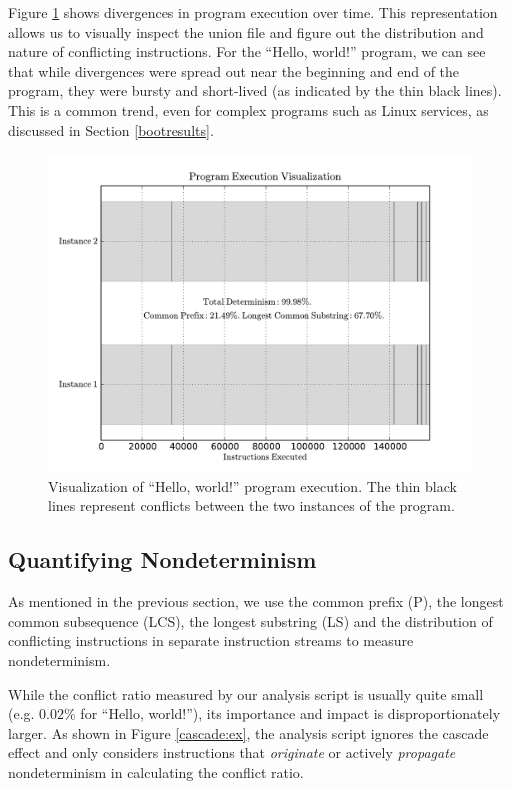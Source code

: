 Figure \ref{hw:trace} shows divergences in program execution
over time. This representation allows
us to visually inspect the union file 
and figure out the distribution and nature of conflicting
instructions. For the ``Hello, world!'' program,
we can see that while divergences were 
spread out near the beginning and end of the program,
they were bursty and short-lived (as indicated
by the thin black lines). This is a common trend, 
even for complex programs such as Linux services,
as discussed in Section \ref{bootresults}.


\begin{figure}[h]
  \center
  \includegraphics[scale=0.60, trim=0cm 0cm 0cm 0cm]{trace.pdf}
  \caption[Visualization of ``Hello, world!'' program execution]%
          {Visualization of ``Hello, world!'' program execution.
          The thin black lines represent conflicts between
          the two instances of the program.}
  \label{hw:trace}
\end{figure} 

\subsection{Quantifying Nondeterminism} \label{alt:stats}
As mentioned in the previous section, we use the 
common prefix (P), the longest common subsequence (LCS),
the longest substring (LS) and the distribution of
conflicting instructions in separate instruction
streams to measure nondeterminism.

While the conflict ratio measured by our analysis script is usually quite small (e.g. $0.02\%$
for ``Hello, world!''), its importance and impact is disproportionately larger.
As shown in Figure \ref{cascade:ex},  the analysis script 
ignores the cascade effect and only considers instructions that {\em originate} or actively {\em propagate}
nondeterminism in calculating the conflict ratio. 

